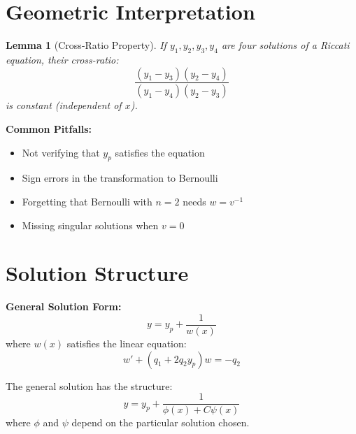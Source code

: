 \documentclass[12pt]{article}
\newtheorem{lemma}{Lemma}
\begin{document}
\section{Geometric Interpretation}

\begin{lemma}[Cross-Ratio Property]
If $y_1, y_2, y_3, y_4$ are four solutions of a Riccati equation, their cross-ratio:
$$\frac{(y_1 - y_3)(y_2 - y_4)}{(y_1 - y_4)(y_2 - y_3)}$$
is constant (independent of $x$).
\end{lemma}

\begin{warning}
\textbf{Common Pitfalls:}
\begin{itemize}
    \item Not verifying that $y_p$ satisfies the equation
    \item Sign errors in the transformation to Bernoulli
    \item Forgetting that Bernoulli with $n = 2$ needs $w = v^{-1}$
    \item Missing singular solutions when $v = 0$
\end{itemize}
\end{warning}

\section{Solution Structure}

\begin{keypoint}
\textbf{General Solution Form:}
$$y = y_p + \frac{1}{w(x)}$$
where $w(x)$ satisfies the linear equation:
$$w' + (q_1 + 2q_2y_p)w = -q_2$$

The general solution has the structure:
$$y = y_p + \frac{1}{\phi(x) + C\psi(x)}$$
where $\phi$ and $\psi$ depend on the particular solution chosen.
\end{keypoint}
\end{document}
